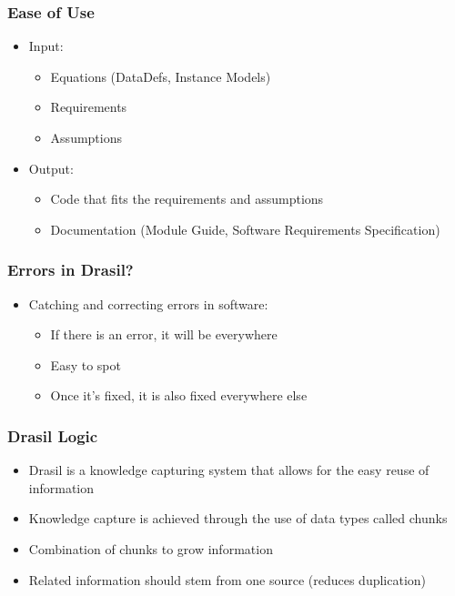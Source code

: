 \documentclass{beamer}
\begin{document}
\begin{frame}
\frametitle{Ease of Use}
\begin{itemize}
 \item<1-> Input:
  \begin{itemize}
   \item<2-> Equations (DataDefs, Instance Models)
   \item<3-> Requirements
   \item<4-> Assumptions\newline
  \end{itemize}
 \item<5-> Output:
  \begin{itemize}
   \item<6-> Code that fits the requirements and assumptions
   \item<7-> Documentation (Module Guide, Software Requirements Specification)
  \end{itemize}
\end{itemize}
\end{frame}

\begin{frame}
\frametitle{Errors in Drasil?}
\begin{itemize}
 \item<1-> Catching and correcting errors in software:\linebreak
  \begin{itemize}
   \item<2-> If there is an error, it will be everywhere\linebreak
   \item<3-> Easy to spot\linebreak
   \item<4-> Once it's fixed, it is also fixed everywhere else\linebreak
  \end{itemize}
\end{itemize}
\end{frame}

\begin{frame}
\frametitle{Drasil Logic}
\begin{itemize}
 \item<1-> Drasil is a knowledge capturing system that allows for the easy reuse of information
 \item<2-> Knowledge capture is achieved through the use of data types called chunks
 \item<3-> Combination of chunks to grow information
 \item<4-> Related information should stem from one source (reduces duplication)
\end{itemize}
\end{frame}
\end{document}
